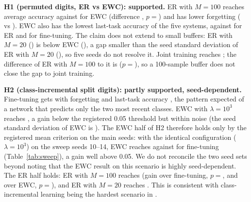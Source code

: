 \textbf{H1 (permuted digits, ER vs EWC): supported.} ER with $M{=}100$ reaches  average accuracy against  for EWC (difference , $p{=}$) and has lower forgetting ( vs ). EWC also has the lowest last-task accuracy of the five systems,  against  for ER and  for fine-tuning. The claim does not extend to small buffers: ER with $M{=}20$ () is below EWC (), a gap smaller than the seed standard deviation of ER with $M{=}20$ (), so five seeds do not resolve it. Joint training reaches ; the difference of ER with $M{=}100$ to it is  ($p{=}$), so a 100-sample buffer does not close the gap to joint training.

\textbf{H2 (class-incremental split digits): partly supported, seed-dependent.} Fine-tuning gets  with forgetting  and last-task accuracy , the pattern expected of a network that predicts only the two most recent classes. EWC with $\lambda{=}10^3$ reaches , a gain below the registered 0.05 threshold but within noise (the seed standard deviation of EWC is ). The EWC half of H2 therefore holds only by the registered mean criterion on the main seeds: with the identical configuration ($\lambda{=}10^3$) on the sweep seeds 10--14, EWC reaches  against  for fine-tuning (Table~\ref{tab:sweep}), a gain well above 0.05. We do not reconcile the two seed sets beyond noting that the EWC result on this scenario is highly seed-dependent. The ER half holds: ER with $M{=}100$ reaches  (gain  over fine-tuning, $p{=}$, and  over EWC, $p{=}$), and ER with $M{=}20$ reaches . This is consistent with class-incremental learning being the hardest scenario in \cite{ven2019three}.

